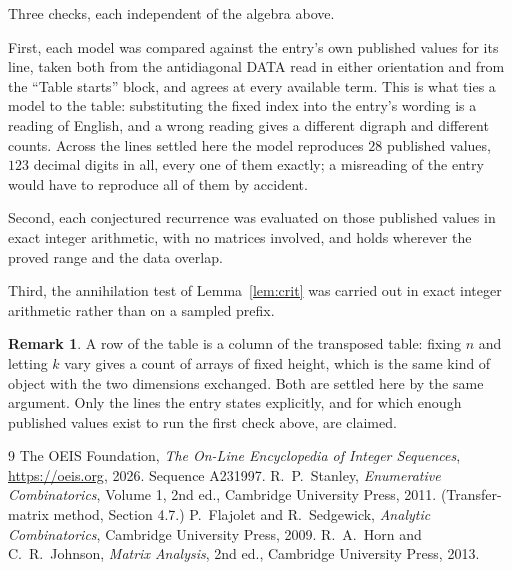 \documentclass[11pt,a4paper]{article}
\theoremstyle{plain}
\theoremstyle{definition}
\newtheorem{remark}[theorem]{Remark}
\begin{document}
Three checks, each independent of the algebra above.

First, each model was compared against the entry's own published values for its line, taken
both from the antidiagonal DATA read in either orientation and from the ``Table starts''
block, and agrees at every available term. This is what ties a model to the table:
substituting the fixed index into the entry's wording is a reading of English, and a wrong
reading gives a different digraph and different counts. Across the lines settled here the
model reproduces $28$ published values, $123$ decimal digits in all, every one of
them exactly; a misreading of the entry would have to reproduce all of them by accident.

Second, each conjectured recurrence was evaluated on those published values in exact
integer arithmetic, with no matrices involved, and holds wherever the proved range and the
data overlap.

Third, the annihilation test of Lemma~\ref{lem:crit} was carried out in exact integer
arithmetic rather than on a sampled prefix.

\begin{remark}
A row of the table is a column of the transposed table: fixing $n$ and letting $k$ vary gives a
count of arrays of fixed height, which is the same kind of object with the two dimensions
exchanged. Both are settled here by the same argument. Only the lines the entry states
explicitly, and for which enough published values exist to run the first check above, are
claimed.
\end{remark}

\begin{thebibliography}{9}
 The OEIS Foundation, \emph{The On-Line Encyclopedia of Integer
Sequences}, \url{https://oeis.org}, 2026. Sequence A231997.
 R.~P.~Stanley, \emph{Enumerative Combinatorics}, Volume 1, 2nd ed.,
Cambridge University Press, 2011. (Transfer-matrix method, Section 4.7.)
 P.~Flajolet and R.~Sedgewick, \emph{Analytic Combinatorics}, Cambridge
University Press, 2009.
 R.~A.~Horn and C.~R.~Johnson, \emph{Matrix Analysis}, 2nd ed., Cambridge
University Press, 2013.
\end{thebibliography}
\end{document}
